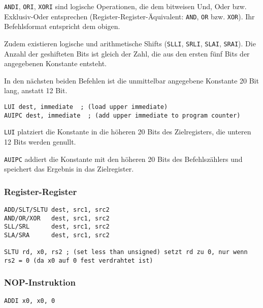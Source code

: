 \lstinline[style=risc-v_Assembler]!ANDI!, \lstinline[style=risc-v_Assembler]!ORI!, \lstinline[style=risc-v_Assembler]!XORI! sind logische Operationen, die dem bitweisen Und, Oder bzw. Exklusiv-Oder entsprechen (Register-Register-Äquivalent: \lstinline[style=risc-v_Assembler]!AND!, \lstinline[style=risc-v_Assembler]!OR! bzw. \lstinline[style=risc-v_Assembler]!XOR!). Ihr
Befehlsformat entspricht dem obigen.

Zudem existieren logische und arithmetische Shifts (\lstinline[style=risc-v_Assembler]!SLLI!, \lstinline[style=risc-v_Assembler]!SRLI!, \lstinline[style=risc-v_Assembler]!SLAI!, \lstinline[style=risc-v_Assembler]!SRAI!). Die Anzahl
der geshifteten Bits ist gleich der Zahl, die aus den ersten fünf Bits der angegebenen Konstante entsteht.

In den nächsten beiden Befehlen ist die unmittelbar angegebene Konstante 20 Bit lang, anstatt 12 Bit.

\begin{lstlisting}[style=risc-v_Assembler]
LUI dest, immediate  ; (load upper immediate)
AUIPC dest, immediate  ; (add upper immediate to program counter)
\end{lstlisting}

\lstinline[style=risc-v_Assembler]!LUI! platziert die Konstante in die höheren 20 Bits des Zielregisters, die unteren 12 Bits werden genullt.

\lstinline[style=risc-v_Assembler]!AUIPC! addiert die Konstante mit den höheren 20 Bits des Befehlszählers und speichert das Ergebnis in das Zielregister.

\subsubsection{Register-Register}

\begin{lstlisting}[style=risc-v_Assembler]
ADD/SLT/SLTU dest, src1, src2
AND/OR/XOR   dest, src1, src2
SLL/SRL      dest, src1, src2
SLA/SRA      dest, src1, src2

SLTU rd, x0, rs2 ; (set less than unsigned) setzt rd zu 0, nur wenn rs2 = 0 (da x0 auf 0 fest verdrahtet ist)
\end{lstlisting}

\subsubsection{NOP-Instruktion}

\begin{lstlisting}[style=risc-v_Assembler]
ADDI x0, x0, 0
\end{lstlisting}

